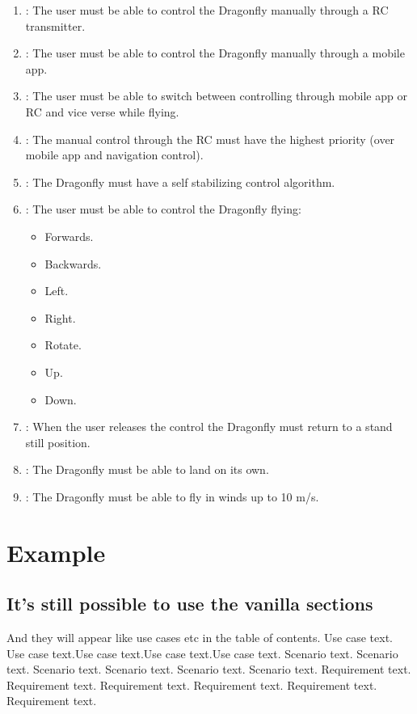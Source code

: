 \documentclass[a4paper]{article}
\makeatletter
\newcommand{\labitem}[2]{%
\def\@itemlabel{\textbf{#2}}
\item
\def\@currentlabel{#2}\label{#1}}
\makeatother
\begin{document}
\begin{enumerate}
\labitem{req:cf.1}{Control Flight.1}: The user must be able to control the Dragonfly manually through a RC transmitter.
\labitem{req:cf.2}{Control Flight.2}: The user must be able to control the Dragonfly manually through a mobile app.
\labitem{req:cf.3}{Control Flight.3}: The user must be able to switch between controlling through mobile app or RC and vice verse while flying.
\labitem{req:cf.4}{Control Flight.4}: The manual control through the RC must have the highest priority (over mobile app and navigation control).
\labitem{req:cf.5}{Control Flight.5}: The Dragonfly must have a self stabilizing control algorithm.
\labitem{req:cf.6}{Control Flight.6}: The user must be able to control the Dragonfly flying:
\begin{itemize}
\item Forwards.
\item Backwards.
\item Left.
\item Right.
\item Rotate.
\item Up.
\item Down.
\end{itemize}
\labitem{req:cf.7}{Control Flight.7}: When the user releases the control the Dragonfly must return to a stand still position.
\labitem{req:cf.8}{Control Flight.8}: The Dragonfly must be able to land on its own.
\labitem{req:cf.9}{Control Flight.9}: The Dragonfly must be able to fly in winds up to 10 m/s.
\end{enumerate}


\section{Example}
\subsection{It's still possible to use the vanilla sections}
And they will appear like use cases etc in the table of contents.
 Use case text. Use case text.Use case text.Use case text.Use case text.
 Scenario text. Scenario text. Scenario text. Scenario text. Scenario text. Scenario text.
 Requirement text. Requirement text. Requirement text. Requirement text. Requirement text. Requirement text.
\end{document}
